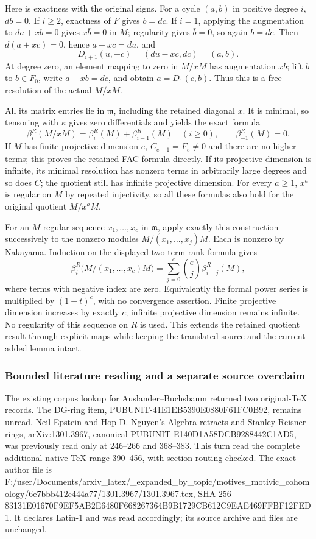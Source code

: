 Here is exactness with the original signs. For a cycle \((a,b)\) in positive degree \(i\), \(db=0\). If \(i\ge2\), exactness of \(F\) gives \(b=dc\). If \(i=1\), applying the augmentation to \(da+xb=0\) gives \(x\bar b=0\) in \(M\); regularity gives \(\bar b=0\), so again \(b=dc\). Then \(d(a+xc)=0\), hence \(a+xc=du\), and \[
D_{i+1}(u,-c)=(du-xc,dc)=(a,b).
\] At degree zero, an element mapping to zero in \(M/xM\) has augmentation \(x\bar b\); lift \(\bar b\) to \(b\in F_0\), write \(a-xb=dc\), and obtain \(a=D_1(c,b)\). Thus this is a free resolution of the actual \(M/xM\).

All its matrix entries lie in \(\mathfrak m\), including the retained diagonal \(x\). It is minimal, so tensoring with \(\kappa\) gives zero differentials and yields the exact formula \[
\beta_i^R(M/xM)=\beta_i^R(M)+\beta_{i-1}^R(M)
\quad(i\ge0),\qquad \beta_{-1}^R(M)=0 .
\] If \(M\) has finite projective dimension \(e\), \(C_{e+1}=F_e\ne0\) and there are no higher terms; this proves the retained FAC formula directly. If its projective dimension is infinite, its minimal resolution has nonzero terms in arbitrarily large degrees and so does \(C\); the quotient still has infinite projective dimension. For every \(a\ge1\), \(x^a\) is regular on \(M\) by repeated injectivity, so all these formulas also hold for the original quotient \(M/x^aM\).

For an \(M\)-regular sequence \(x_1,\ldots,x_c\) in \(\mathfrak m\), apply exactly this construction successively to the nonzero modules \(M/(x_1,\ldots,x_j)M\). Each is nonzero by Nakayama. Induction on the displayed two-term rank formula gives \[
\beta_i^R\bigl(M/(x_1,\ldots,x_c)M\bigr)
=\sum_{j=0}^c\binom cj\beta_{i-j}^R(M),
\] where terms with negative index are zero. Equivalently the formal power series is multiplied by \((1+t)^c\), with no convergence assertion. Finite projective dimension increases by exactly \(c\); infinite projective dimension remains infinite. No regularity of this sequence on \(R\) is used. This extends the retained quotient result through explicit maps while keeping the translated source and the current added lemma intact.

\subsubsection{Bounded literature reading and a separate source overclaim}\label{algebra-proof-023-bounded-literature-reading-and-a-separate-source-overclaim}

The existing corpus lookup for Auslander--Buchsbaum returned two original-TeX records. The DG-ring item, PUBUNIT-41E1EB5390E0880F61FC0B92, remains unread. Neil Epstein and Hop D. Nguyen's Algebra retracts and Stanley-Reisner rings, arXiv:1301.3967, canonical PUBUNIT-E140D1A58DCB9288442C1AD5, was previously read only at 246--266 and 368--383. This turn read the complete additional native TeX range 390--456, with section routing checked. The exact author file is F:/user/Documents/arxiv\_latex/\_expanded\_by\_topic/motives\_motivic\_cohomology/6e7bbb412e444a77/1301.3967/1301.3967.tex, SHA-256 83131E01670F9EF5AB2E6480F668267364B9B1729CB612C9EAE469FFBF12FED1. It declares Latin-1 and was read accordingly; its source archive and files are unchanged.

